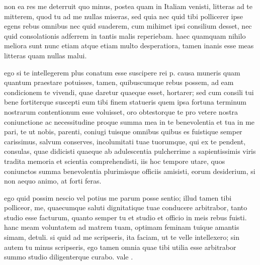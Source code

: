 


 non ea res me deterruit quo minus, postea quam in Italiam venisti, litteras ad te mitterem, quod tu ad me nullas miseras, sed quia nec quid tibi pollicerer ipse egens rebus omnibus nec quid suaderem, cum mihimet ipsi consilium desset, nec quid consolationis adferrem in tantis malis reperiebam. haec quamquam nihilo meliora sunt nunc etiam atque etiam multo desperatiora, tamen inanis esse meas litteras quam nullas malui.

 ego si te intellegerem plus conatum esse suscipere rei p. causa muneris quam quantum praestare potuisses, tamen, quibuscumque rebus possem, ad eam condicionem te vivendi, quae daretur quaeque esset, hortarer; sed cum consili tui bene fortiterque suscepti eum tibi finem statueris quem ipsa fortuna terminum nostrarum contentionum esse voluisset, oro obtestorque te pro vetere nostra coniunctione ac necessitudine proque summa mea in te benevolentia et tua in me pari, te ut nobis, parenti, coniugi tuisque omnibus quibus es fuistique semper carissimus, salvum conserves, incolumitati tuae tuorumque, qui ex te pendent, consulas, quae didicisti quaeque ab adulescentia pulcherrime a sapientissimis viris tradita memoria et scientia comprehendisti, iis hoc tempore utare, quos coniunctos summa benevolentia plurimisque officiis amisisti, eorum desiderium, si non aequo animo, at forti feras.

 ego quid possim nescio vel potius me parum posse sentio; illud tamen tibi polliceor, me, quaecumque saluti dignitatique tuae conducere arbitrabor, tanto studio esse facturum, quanto semper tu et studio et officio in meis rebus fuisti. hanc meam voluntatem ad matrem tuam, optimam feminam tuique amantis simam, detuli. si quid ad me scripseris, ita faciam, ut te velle intellexero; sin autem tu minus scripseris, ego tamen omnia quae tibi utilia esse arbitrabor summo studio diligenterque curabo. vale .
